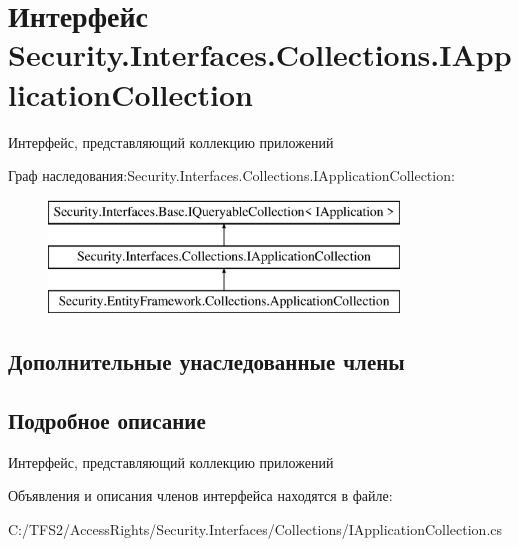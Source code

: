 \hypertarget{interface_security_1_1_interfaces_1_1_collections_1_1_i_application_collection}{}\section{Интерфейс Security.\+Interfaces.\+Collections.\+I\+Application\+Collection}
\label{interface_security_1_1_interfaces_1_1_collections_1_1_i_application_collection}


Интерфейс, представляющий коллекцию приложений  


Граф наследования\+:Security.\+Interfaces.\+Collections.\+I\+Application\+Collection\+:\begin{figure}[H]
\begin{center}
\leavevmode
\includegraphics[height=3.000000cm]{db/d25/interface_security_1_1_interfaces_1_1_collections_1_1_i_application_collection}
\end{center}
\end{figure}
\subsection*{Дополнительные унаследованные члены}


\subsection{Подробное описание}
Интерфейс, представляющий коллекцию приложений 



Объявления и описания членов интерфейса находятся в файле\+:\begin{DoxyCompactItemize}
\item 
C\+:/\+T\+F\+S2/\+Access\+Rights/\+Security.\+Interfaces/\+Collections/I\+Application\+Collection.\+cs\end{DoxyCompactItemize}
